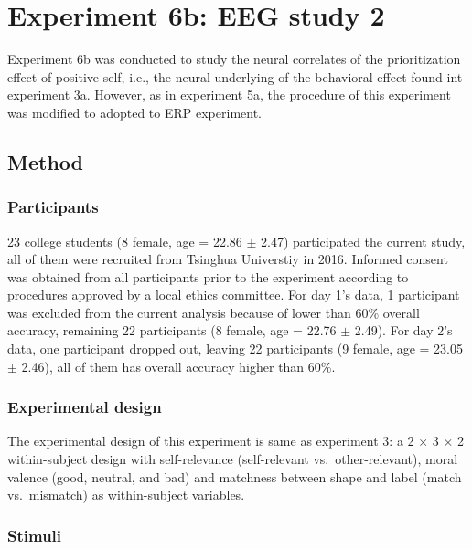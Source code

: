 \documentclass[man]{apa6}
\begin{document}
\hypertarget{experiment-6b-eeg-study-2}{%
\section{Experiment 6b: EEG study 2}\label{experiment-6b-eeg-study-2}}

Experiment 6b was conducted to study the neural correlates of the prioritization effect of positive self, i.e., the neural underlying of the behavioral effect found int experiment 3a. However, as in experiment 5a, the procedure of this experiment was modified to adopted to ERP experiment.

\hypertarget{method-8}{%
\subsection{Method}\label{method-8}}

\hypertarget{participants-10}{%
\subsubsection{Participants}\label{participants-10}}

23 college students (8 female, age = 22.86 \(\pm\) 2.47) participated the current study, all of them were recruited from Tsinghua Universtiy in 2016. Informed consent was obtained from all participants prior to the experiment according to procedures approved by a local ethics committee. For day 1's data, 1 participant was excluded from the current analysis because of lower than 60\% overall accuracy, remaining 22 participants (8 female, age = 22.76 \(\pm\) 2.49). For day 2's data, one participant dropped out, leaving 22 participants (9 female, age = 23.05 \(\pm\) 2.46), all of them has overall accuracy higher than 60\%.

\hypertarget{experimental-design-4}{%
\subsubsection{Experimental design}\label{experimental-design-4}}

The experimental design of this experiment is same as experiment 3: a 2 × 3 × 2 within-subject design with self-relevance (self-relevant vs.~other-relevant), moral valence (good, neutral, and bad) and matchness between shape and label (match vs.~mismatch) as within-subject variables.

\hypertarget{stimuli-5}{%
\subsubsection{Stimuli}\label{stimuli-5}}
\end{document}
